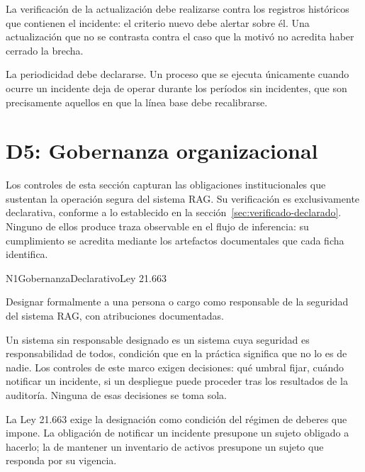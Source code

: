 La verificación de la actualización debe realizarse contra los registros históricos que contienen el incidente: el criterio nuevo debe alertar sobre él. Una actualización que no se contrasta contra el caso que la motivó no acredita haber cerrado la brecha.

La periodicidad debe declararse. Un proceso que se ejecuta únicamente cuando ocurre un incidente deja de operar durante los períodos sin incidentes, que son precisamente aquellos en que la línea base debe recalibrarse.


\section{D5: Gobernanza organizacional}
\label{sec:fichas-d5}

Los controles de esta sección capturan las obligaciones institucionales que sustentan la operación segura del sistema RAG. Su verificación es exclusivamente declarativa, conforme a lo establecido en la sección~\ref{sec:verificado-declarado}. Ninguno de ellos produce traza observable en el flujo de inferencia: su cumplimiento se acredita mediante los artefactos documentales que cada ficha identifica.

  {N1}{Gobernanza}{Declarativo}{Ley 21.663}

Designar formalmente a una persona o cargo como responsable de la seguridad del sistema RAG, con atribuciones documentadas.

Un sistema sin responsable designado es un sistema cuya seguridad es responsabilidad de todos, condición que en la práctica significa que no lo es de nadie. Los controles de este marco exigen decisiones: qué umbral fijar, cuándo notificar un incidente, si un despliegue puede proceder tras los resultados de la auditoría. Ninguna de esas decisiones se toma sola.

La Ley 21.663 exige la designación como condición del régimen de deberes que impone. La obligación de notificar un incidente presupone un sujeto obligado a hacerlo; la de mantener un inventario de activos presupone un sujeto que responda por su vigencia.

